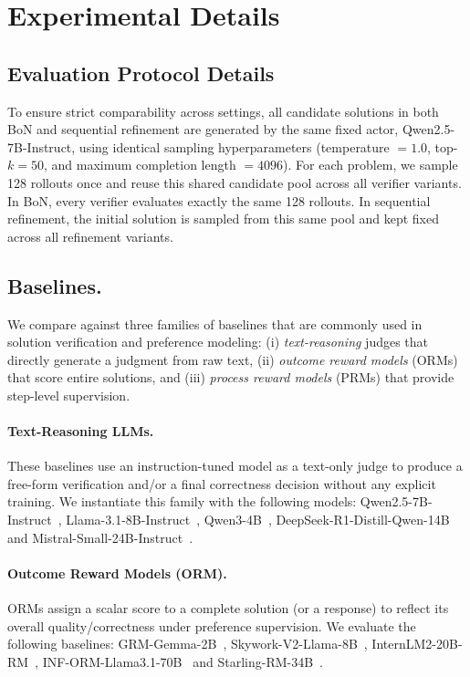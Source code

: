 \documentclass[11pt]{article}
\begin{document}
\section{Experimental Details}

\subsection{Evaluation Protocol Details}
\label{sec:appendix_eval_protocol}

To ensure strict comparability across settings, all candidate solutions in both BoN and sequential refinement are generated by the same fixed actor, Qwen2.5-7B-Instruct, using identical sampling hyperparameters (temperature $=1.0$, top-$k=50$, and maximum completion length $=4096$). For each problem, we sample 128 rollouts once and reuse this shared candidate pool across all verifier variants. In BoN, every verifier evaluates exactly the same 128 rollouts. In sequential refinement, the initial solution is sampled from this same pool and kept fixed across all refinement variants.

\subsection{Baselines.}
\label{sec:appendix_baselines}

We compare against three families of baselines that are commonly used in
solution verification and preference modeling: (i) \emph{text-reasoning} judges
that directly generate a judgment from raw text, (ii) \emph{outcome reward models}
(ORMs) that score entire solutions, and (iii) \emph{process reward models}
(PRMs) that provide step-level supervision.

\paragraph{Text-Reasoning LLMs.}
These baselines use an instruction-tuned model as a text-only judge to produce
a free-form verification and/or a final correctness decision without any
explicit training.
We instantiate this family with the following models: Qwen2.5-7B-Instruct~\cite{Qwen2.5_Models}, Llama-3.1-8B-Instruct~\cite{Llama3_Models}, Qwen3-4B~\cite{Qwen3_Models}, DeepSeek-R1-Distill-Qwen-14B~\cite{Deepseek3_Models} and Mistral-Small-24B-Instruct~\cite{mistral-small-3-24b}.

\paragraph{Outcome Reward Models (ORM).}
ORMs assign a scalar score to a complete solution (or a response) to reflect
its overall quality/correctness under preference supervision.
We evaluate the following baselines: GRM-Gemma-2B~\cite{Gemma_2b_RM}, Skywork-V2-Llama-8B~\cite{Skywork_ORM_V2}, InternLM2-20B-RM~\cite{InternLM2}, INF-ORM-Llama3.1-70B~\cite{INF_ORM_Llama3.1_70B} and Starling-RM-34B~\cite{Starling-RM}.
\end{document}
